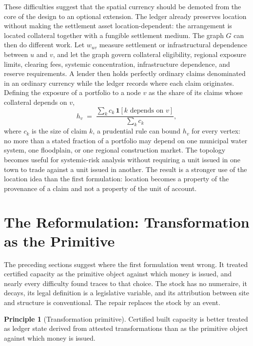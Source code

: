 \documentclass[11pt]{article}
\theoremstyle{definition}
\newtheorem{principle}{Principle}
\begin{document}
These difficulties suggest that the spatial currency should be demoted from the core of the design to an optional extension. The ledger already preserves location without making the settlement asset location-dependent: the arrangement is located collateral together with a fungible settlement medium. The graph $G$ can then do different work. Let $w_{uv}$ measure settlement or infrastructural dependence between $u$ and $v$, and let the graph govern collateral eligibility, regional exposure limits, clearing fees, systemic concentration, infrastructure dependence, and reserve requirements. A lender then holds perfectly ordinary claims denominated in an ordinary currency while the ledger records where each claim originates. Defining the exposure of a portfolio to a node $v$ as the share of its claims whose collateral depends on $v$,
\begin{equation}
h_v \;=\; \frac{\sum_{k} c_k\,\mathbf{1}[k \text{ depends on } v]}{\sum_{k} c_k},
\label{eq:exposure}
\end{equation}
where $c_k$ is the size of claim $k$, a prudential rule can bound $h_v$ for every vertex: no more than a stated fraction of a portfolio may depend on one municipal water system, one floodplain, or one regional construction market. The topology becomes useful for systemic-risk analysis without requiring a unit issued in one town to trade against a unit issued in another. The result is a stronger use of the location idea than the first formulation: location becomes a property of the provenance of a claim and not a property of the unit of account.

\section{The Reformulation: Transformation as the Primitive}
\label{sec:repair}

The preceding sections suggest where the first formulation went wrong. It treated certified capacity as the primitive object against which money is issued, and nearly every difficulty found traces to that choice. The stock has no numeraire, it decays, its legal definition is a legislative variable, and its attribution between site and structure is conventional. The repair replaces the stock by an event.

\begin{principle}[Transformation primitive]
Certified built capacity is better treated as ledger state derived from attested transformations than as the primitive object against which money is issued.
\end{principle}
\end{document}
